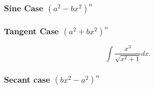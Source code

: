 \subsubsection{Sine Case $(a^2-bx^2)^{n}$}%
\label{ssub:sine_case}

\subsubsection{Tangent Case $(a^2+bx^2)^{n}$}%
\label{ssub:tangent_case}
\[
\int \frac{x^3}{\sqrt{x^2+1} } dx
.\]

\subsubsection{Secant case $(bx^2-a^2)^{n}$}%
\label{ssub:secant_case}












\newpage


